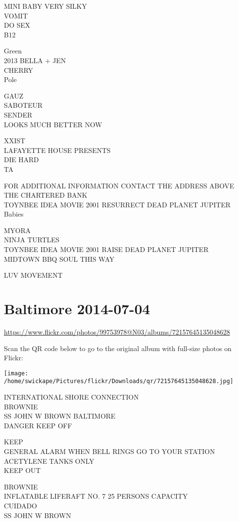 \documentclass[10pt,letterpaper]{article}
\begin{document}
MINI BABY VERY SILKY\\
VOMIT\\
DO SEX\\
B12

Green\\
2013 BELLA + JEN\\
CHERRY\\
Pole

GAUZ\\
SABOTEUR\\
SENDER\\
LOOKS MUCH BETTER NOW

XXIST\\
LAFAYETTE HOUSE PRESENTS\\
DIE HARD\\
TA

FOR ADDITIONAL INFORMATION CONTACT THE ADDRESS ABOVE\\
THE CHARTERED BANK\\
TOYNBEE IDEA MOVIE 2001 RESURRECT DEAD PLANET JUPITER\\
Babies

MYORA\\
NINJA TURTLES\\
TOYNBEE IDEA MOVIE 2001 RAISE DEAD PLANET JUPITER\\
MIDTOWN BBQ SOUL THIS WAY

LUV MOVEMENT


\section*{Baltimore 2014-07-04}

\url{https://www.flickr.com/photos/99753978@N03/albums/72157645135048628}

Scan the QR code below to go to the original album with full-size photos on Flickr:

\texttt{[image: /home/swickape/Pictures/flickr/Downloads/qr/72157645135048628.jpg]}


INTERNATIONAL SHORE CONNECTION\\
BROWNIE\\
SS JOHN W BROWN BALTIMORE\\
DANGER KEEP OFF

KEEP\\
GENERAL ALARM WHEN BELL RINGS GO TO YOUR STATION\\
ACETYLENE TANKS ONLY\\
KEEP OUT

BROWNIE\\
INFLATABLE LIFERAFT NO. 7 25 PERSONS CAPACITY\\
CUIDADO\\
SS JOHN W BROWN
\end{document}
